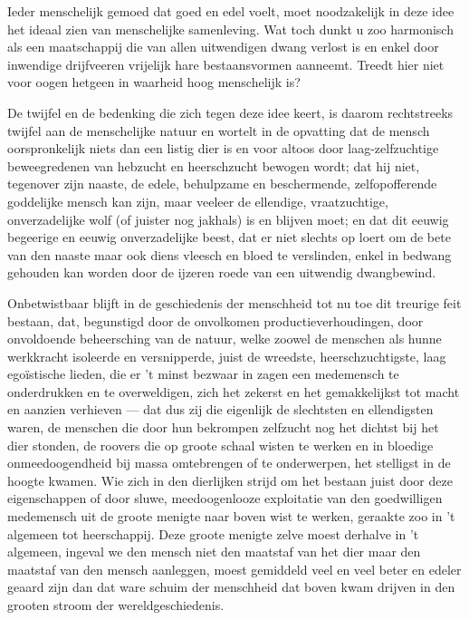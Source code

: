 \documentclass[a4paper, 12pt, oneside, dutch]{article}
\begin{document}
Ieder menschelijk gemoed dat goed en edel voelt, moet noodzakelijk in deze idee het ideaal zien van menschelijke samenleving. Wat toch dunkt u zoo harmonisch als een maatschappij die van allen uitwendigen dwang verlost is en enkel door inwendige drijfveeren vrijelijk hare bestaansvormen aanneemt. Treedt hier niet voor oogen hetgeen in waarheid hoog menschelijk is?

De twijfel en de bedenking die zich tegen deze idee keert, is daarom rechtstreeks twijfel aan de menschelijke natuur en wortelt in de opvatting dat de mensch oorspronkelijk niets dan een listig dier is en voor altoos door laag-zelfzuchtige beweegredenen van hebzucht en heerschzucht bewogen wordt; dat hij niet, tegenover zijn naaste, de edele, behulpzame en beschermende, zelfopofferende goddelijke mensch kan zijn, maar veeleer de ellendige, vraatzuchtige, onverzadelijke wolf (of juister nog jakhals) is en blijven moet; en dat dit eeuwig begeerige en eeuwig onverzadelijke beest, dat er niet slechts op loert om de bete van den naaste maar ook diens vleesch en bloed te verslinden, enkel in bedwang gehouden kan worden door de ijzeren roede van een uitwendig dwangbewind.

Onbetwistbaar blijft in de geschiedenis der menschheid tot nu toe dit treurige feit bestaan, dat, begunstigd door de onvolkomen productieverhoudingen, door onvoldoende beheersching van de natuur, welke zoowel de menschen als hunne werkkracht isoleerde en versnipperde, juist de wreedste, heerschzuchtigste, laag egoïstische lieden, die er 't minst bezwaar in zagen een medemensch te onderdrukken en te overweldigen, zich het zekerst en het gemakkelijkst tot macht en aanzien verhieven --- dat dus zij die eigenlijk de slechtsten en ellendigsten waren, de menschen die door hun bekrompen zelfzucht nog het dichtst bij het dier stonden, de roovers die op groote schaal wisten te werken en in bloedige onmeedoogendheid bij massa omtebrengen of te onderwerpen, het stelligst in de hoogte kwamen. Wie zich in den dierlijken strijd om het bestaan juist door deze eigenschappen of door sluwe, meedoogenlooze exploitatie van den goedwilligen medemensch uit de groote menigte naar boven wist te werken, geraakte zoo in 't algemeen tot heerschappij. Deze groote menigte zelve moest derhalve in 't algemeen, ingeval we den mensch niet den maatstaf van het dier maar den maatstaf van den mensch aanleggen, moest gemiddeld veel en veel beter en edeler geaard zijn dan dat ware schuim der menschheid dat boven kwam drijven in den grooten stroom der wereldgeschiedenis.
\end{document}
